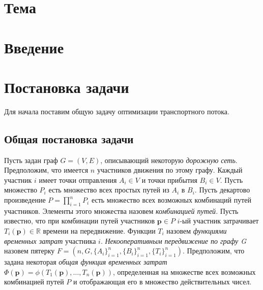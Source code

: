 \documentclass[12pt, a4paper]{article}
\begin{document}
\newpage
\pagestyle{plain}
\tableofcontents{}
\newpage	
	
 \section*{Тема}



\section{Введение}


\newpage
\section{Постановка задачи}

Для начала поставим общую задачу оптимизации транспортного потока.


\subsection{Общая постановка задачи}

Пусть задан граф $G = (V, E)$, описывающий некоторую \textit{дорожную сеть}. Предположим, что имеется $n$ участников движения по этому графу. Каждый участник $i$ имеет точки отправления $A_i \in V$ и точки прибытия $B_i \in V$. Пусть множество $P_i$ есть множество всех простых путей из $A_i$ в $B_i$. Пусть декартово произведение ${P = \prod \limits_{i = 1} ^ n P_i}$ есть множество всех возможных комбинаций путей участников. Элементы этого множества назовем \textit{комбинацией путей}. Пусть известно, что при комбинации путей участников ${\textbf{p} \in P}$ $i$-ый участник затрачивает $T_i(\textbf{p}) \in \mathbb{R}$ времени на передвижение. 
Функции  $T_i$ назовем \textit{функциями временных затрат} участника $i$.
\textit{Некооперативным передвижение по графу G} назовем пятерку $F = (n, G, \{A_i\}_{i = 1}^{n}, \{B_i\}_{i = 1}^{n}, \{T_i\}_{i = 1}^{n})$. Предположим, что задана некоторая \textit{общая функция временных затрат} $\Phi (\textbf{p}) = \phi (T_1 (\textbf{p}), \ldots, T_n(\textbf{p}))$, определенная на множестве всех возможных комбинацией путей $P$ и отображающая его в множество действительных чисел.
\end{document}
